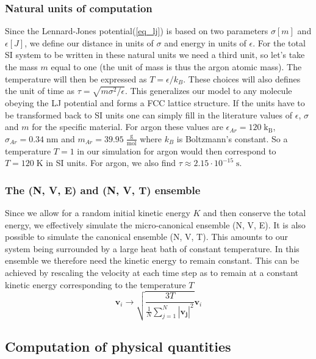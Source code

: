 \documentclass[twoside]{article}
\newcommand{\unit}[1]{\ensuremath{\; \mathrm{#1}}}
\begin{document}
\subsubsection*{Natural units of computation}
Since the Lennard-Jones potential(\eqref{eq_lj}) is based on two parameters $\sigma [m]$ and $\epsilon [J]$, we define our distance in units of $\sigma$ and energy in units of $\epsilon$. For the total SI system to be written in these natural units we need a third unit, so let's take the mass $m$ equal to one (the unit of mass is thus the argon atomic mass). The temperature will then be expressed as $T  = \epsilon/k_B$. These choices will also defines the unit of time as $\tau = \sqrt{m\sigma^2/\epsilon}$. This generalizes our model to any molecule obeying the LJ potential and forms a FCC lattice structure. If the units have to be transformed back to SI units one can simply fill in the literature values of $\epsilon$, $\sigma$ and $m$ for the specific material. For argon these values are $\epsilon_{Ar} = 120 \unit{k_B}$, $\sigma_{Ar} = 0.34 \unit{nm}$ and $m_{Ar} = 39.95 \unit{\frac{g}{mol}}$ where $k_B$ is Boltzmann's constant. So a temperature $T = 1$ in our simulation for argon would then correspond to $T = 120 \unit{K}$ in SI units. For argon, we also find $\tau \approx 2.15 \cdot 10^{-15} \unit{s}$.

\subsubsection*{The (N, V, E) and (N, V, T) ensemble}
Since we allow for a random initial kinetic energy $K$ and then conserve the total energy, we effectively simulate the micro-canonical ensemble (N, V, E). It is also possible to simulate the canonical ensemble (N, V, T). This amounts to our system being surrounded by a large heat bath of constant temperature. In this ensemble we therefore need the kinetic energy to remain constant. This can be achieved by rescaling the velocity at each time step as to remain at a constant kinetic energy corresponding to the temperature $T$
\begin{equation}\label{eq_vel_rescale}
\mathbf{v}_i \rightarrow \sqrt{\frac{3 T}{\frac{1}{N} \sum_{j=1}^N |\mathbf{v_j}|^2}} \mathbf{v}_i
\end{equation}


\subsection{Computation of physical quantities}
\end{document}
